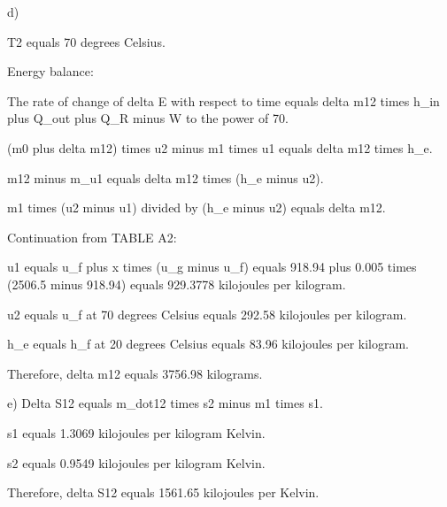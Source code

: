 d)

T2 equals 70 degrees Celsius.

Energy balance:

The rate of change of delta E with respect to time equals delta m12 times h_in plus Q_out plus Q_R minus W to the power of 70.

(m0 plus delta m12) times u2 minus m1 times u1 equals delta m12 times h_e.

m12 minus m_u1 equals delta m12 times (h_e minus u2).

m1 times (u2 minus u1) divided by (h_e minus u2) equals delta m12.

Continuation from TABLE A2:

u1 equals u_f plus x times (u_g minus u_f) equals 918.94 plus 0.005 times (2506.5 minus 918.94) equals 929.3778 kilojoules per kilogram.

u2 equals u_f at 70 degrees Celsius equals 292.58 kilojoules per kilogram.

h_e equals h_f at 20 degrees Celsius equals 83.96 kilojoules per kilogram.

Therefore, delta m12 equals 3756.98 kilograms.

e) Delta S12 equals m_dot12 times s2 minus m1 times s1.

s1 equals 1.3069 kilojoules per kilogram Kelvin.

s2 equals 0.9549 kilojoules per kilogram Kelvin.

Therefore, delta S12 equals 1561.65 kilojoules per Kelvin.